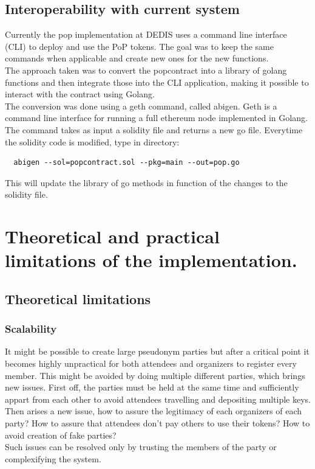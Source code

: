 \documentclass[11pt, a4paper, twoside, openright]{article} %
\begin{document}
\subsection{Interoperability with current system}
Currently the pop implementation at DEDIS uses a command line interface (CLI) to deploy and use the PoP tokens. The goal was to keep the same commands when applicable and create new ones for the new functions.\\The approach taken was to convert the popcontract into a library of golang functions and then integrate those into the CLI application, making it possible to interact with the contract using Golang.\\
The conversion was done using a geth command, called abigen. Geth is a command line interface for running a full ethereum node implemented in Golang. The command takes as input a solidity file and returns a new go file. Everytime the solidity code is modified, type in directory:
\begin{verbatim}
  abigen --sol=popcontract.sol --pkg=main --out=pop.go
\end{verbatim}
This will update the library of go methods in function of the changes to the solidity file.

\section{Theoretical and practical limitations of the implementation.}
\subsection{Theoretical limitations}
\subsubsection*{Scalability}
It might be possible to create large pseudonym parties but after a critical point it becomes highly unpractical for both attendees and organizers to register every member. This might be avoided by doing multiple different parties, which brings new issues. First off, the parties must be held at the same time and sufficiently appart from each other to avoid attendees travelling and depositing multiple keys. Then arises a new issue, how to assure the legitimacy of each organizers of each party? How to assure that attendees don't pay others to use their tokens? How to avoid creation of fake parties? \\ Such issues can be resolved only by trusting the members of the party or complexifying the system.
\end{document}
